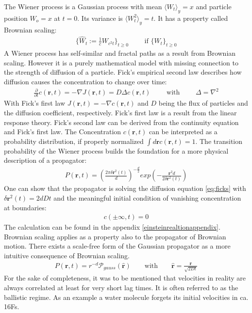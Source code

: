 \documentclass[
  a4paper,BCOR10mm,oneside,
  bibtotoc,idxtotoc,
  headsepline,footsepline,%
  fleqn,openbib
]{scrbook}
\begin{document}
The Wiener process is a Gaussian process with mean $\langle W_t \rangle_y=x$ and particle position $W_o=x$ at $t=0$. Its variance is $\langle W^2_t \rangle_y= t$. It has a property called Brownian scaling:
\begin{align}
\label{Brownianscaling}
\{\hat{W}_t := \frac{1}{c} W_{c^2 t} \}_{t\geq0} \qquad  \text{ if } \{W_t\}_{t \geq 0}
\end{align}
A Wiener process has self-similar and fractal paths as a result from Brownian scaling.\newline 
However it is a purely mathematical model with missing connection to the strength of diffusion of a particle. Fick's empirical second law describes how diffusion causes the concentration to change over time:
\begin{align}
 \frac{\partial}{\partial t} c(\bm{r},t) = - \nabla J (\bm{r},t) = D  \Delta c(\bm{r},t) \qquad \text{ with } \qquad \Delta= \nabla^2  \label{eq:ficks}
\end{align}
With Fick's first law $J(\bm{r},t)=- \nabla c(\bm{r},t)$ and $D$ being the flux of particles and the diffusion coefficient, respectively. Fick's first law is a result from the linear response theory. Fick's second law can be derived from the continuity equation and Fick's first law. The Concentration $c(\bm{r},t)$ can be interpreted as a probability distribution, if properly normalized  $\int d\bm{r} c(\bm{r},t)=1$. The transition probability of the Wiener process builds the foundation for a more physical description of a propagator:
\begin{align}
 P(\bm{r},t)=  \left(\frac{2 \pi \delta \bm{r}^2(t)}{d}\right)^{- \frac{d}{2}} exp \left(- \frac{\bm{r}^2 d}{2 \delta \bm{r}^2(t)} \right) \label{propagator}
\end{align}
One can show that the propagator is solving the diffusion equation \cref{eq:ficks} with $\delta \bm{r}^2(t)=2dDt$ and the meaningful initial condition of vanishing concentration at boundaries: 
\begin{align}
c(\pm \infty,t)=0
\end{align}
The calculation can be found in the appendix \ref{einsteinrealtionappendix}.
Brownian scaling applies as a property also to the propagator of Brownian motion.
There exists a scale-free form of the Gaussian propagator as a more intuitive consequence of Brownian scaling. 
\begin{align}
P(\bm{r},t)= r^{-d} \mathcal{P}_{gauss}(\hat{\bm{r}})  \qquad \text{with} \qquad \hat{\bm{r}} = \frac{\bm{r}}{\sqrt{2Dt}} \label{scalefreeform}
\end{align}
For the sake of completeness, it was to be mentioned that velocities in reality are always correlated at least for very short lag times. It is often referred to as the ballistic regime. As an example a water molecule forgets its initial velocities in ca. 16Fs.
\end{document}
